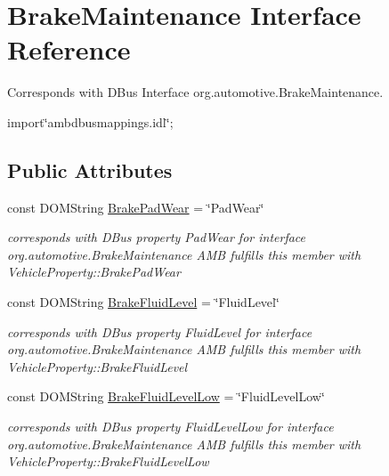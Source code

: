 \hypertarget{interfaceBrakeMaintenance}{\section{Brake\+Maintenance Interface Reference}
\label{interfaceBrakeMaintenance}
}


Corresponds with D\+Bus Interface org.\+automotive.\+Brake\+Maintenance.  




{\ttfamily import\char`\"{}ambdbusmappings.\+idl\char`\"{};}

\subsection*{Public Attributes}
\begin{DoxyCompactItemize}
\item 
\hypertarget{interfaceBrakeMaintenance_a2da7ee50f0528e3e7f1b7317c57a0ea4}{const D\+O\+M\+String \hyperlink{interfaceBrakeMaintenance_a2da7ee50f0528e3e7f1b7317c57a0ea4}{Brake\+Pad\+Wear} = \char`\"{}Pad\+Wear\char`\"{}}\label{interfaceBrakeMaintenance_a2da7ee50f0528e3e7f1b7317c57a0ea4}

\begin{DoxyCompactList}\small\item\em corresponds with D\+Bus property Pad\+Wear for interface org.\+automotive.\+Brake\+Maintenance A\+M\+B fulfills this member with Vehicle\+Property\+::\+Brake\+Pad\+Wear \end{DoxyCompactList}\item 
\hypertarget{interfaceBrakeMaintenance_a84984ddf4ca782a8bf8fd1a64c773aee}{const D\+O\+M\+String \hyperlink{interfaceBrakeMaintenance_a84984ddf4ca782a8bf8fd1a64c773aee}{Brake\+Fluid\+Level} = \char`\"{}Fluid\+Level\char`\"{}}\label{interfaceBrakeMaintenance_a84984ddf4ca782a8bf8fd1a64c773aee}

\begin{DoxyCompactList}\small\item\em corresponds with D\+Bus property Fluid\+Level for interface org.\+automotive.\+Brake\+Maintenance A\+M\+B fulfills this member with Vehicle\+Property\+::\+Brake\+Fluid\+Level \end{DoxyCompactList}\item 
\hypertarget{interfaceBrakeMaintenance_a947300ba92f881da80c38e55c257c68b}{const D\+O\+M\+String \hyperlink{interfaceBrakeMaintenance_a947300ba92f881da80c38e55c257c68b}{Brake\+Fluid\+Level\+Low} = \char`\"{}Fluid\+Level\+Low\char`\"{}}\label{interfaceBrakeMaintenance_a947300ba92f881da80c38e55c257c68b}

\begin{DoxyCompactList}\small\item\em corresponds with D\+Bus property Fluid\+Level\+Low for interface org.\+automotive.\+Brake\+Maintenance A\+M\+B fulfills this member with Vehicle\+Property\+::\+Brake\+Fluid\+Level\+Low \end{DoxyCompactList}\end{DoxyCompactItemize}


